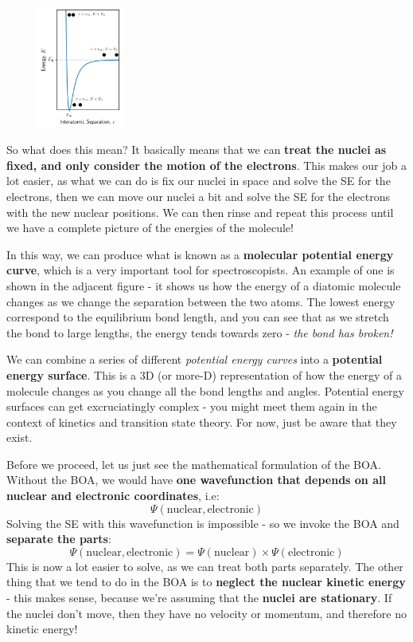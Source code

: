 \documentclass{memoir}[11pt,oneside,a4paper,openany]
\newcommand{\wf}{\ensuremath{\Psi}\xspace}
\begin{document}
\begin{figure}
	\centering
	\includegraphics[width=0.25\textwidth]{PES}
\end{figure}
So what does this mean? It basically means that we can \textbf{treat the nuclei as fixed, and only consider the motion of the electrons}. This makes our job a lot easier, as what we can do is fix our nuclei in space and solve the SE for the electrons, then we can move our nuclei a bit and solve the SE for the electrons with the new nuclear positions. We can then rinse and repeat this process until we have a complete picture of the energies of the molecule!  

In this way, we can produce what is known as a \textbf{molecular potential energy curve}, which is a very important tool for spectroscopists. An example of one is shown in the adjacent figure - it shows us how the energy of a diatomic molecule changes as we change the separation between the two atoms. The lowest energy correspond to the equilibrium bond length, and you can see that as we stretch the bond to large lengths, the energy tends towards zero - \emph{the bond has broken!}

We can combine a series of different \emph{potential energy curves} into a \textbf{potential energy surface}. This is a 3D (or more-D) representation of how the energy of a molecule changes as you change all the bond lengths and angles. Potential energy surfaces can get excruciatingly complex - you might meet them again in the context of kinetics and transition state theory. For now, just be aware that they exist.

Before we proceed, let us just see the mathematical formulation of the BOA. Without the BOA, we would have \textbf{one wavefunction that depends on all nuclear and electronic coordinates}, i.e:
\begin{equation}
	\wf(\text{nuclear},\text{electronic})
\end{equation}
Solving the SE with this wavefunction is impossible - so we invoke the BOA and \textbf{separate the parts}:
\begin{equation}
	\wf(\text{nuclear},\text{electronic}) = \wf(\text{nuclear}) \times \wf(\text{electronic})
\end{equation}
This is now a lot easier to solve, as we can treat both parts separately. The other thing that we tend to do in the BOA is to \textbf{neglect the nuclear kinetic energy} - this makes sense, because we're assuming that the \textbf{nuclei are stationary}. If the nuclei don't move, then they have no velocity or momentum, and therefore no kinetic energy!
\end{document}
